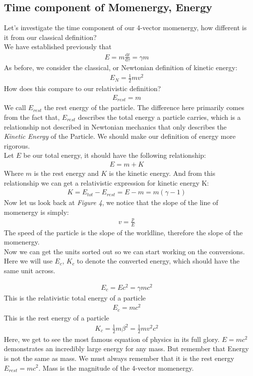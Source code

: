 \documentclass[12pt]{book}
\newcommand{\dydx}[2]{\frac{\text{d} #1}{\text{d} #2}}
\begin{document}
\subsection{Time component of Momenergy, Energy}
Let's investigate the time component of our 4-vector momenergy, how different is it from our classical definition?\\
\newline 
We have established previously that 
\begin{align}
E =m \dydx{t}{\tau} =\gamma m
\end{align}
As before, we consider the classical, or Newtonian definition of kinetic energy:
\begin{align}
E_{N} = \frac{1}{2}mv^2
\end{align}
How does this compare to our relativistic definition?
\begin{align}
E_{rest} = m
\end{align}
We call $E_{rest}$ the rest energy of the particle. The difference here primarily comes from the fact that, $E_{rest}$ describes the total energy a particle carries, which is a relationship not described in Newtonian mechanics that only describes the \textit{Kinetic Energy} of the Particle. We should make our definition of energy more rigorous. \\
\newline
Let $E$ be our total energy, it should have the following relationship:
\begin{align}
E = m + K
\end{align}
Where $m$ is the rest energy and $K$ is the kinetic energy. And from this relationship we can get a relativistic expression for kinetic energy K:
\begin{align}
K = E_{tot} - E_{rest} = E - m = m(\gamma - 1)
\end{align}
Now let us look back at \textit{Figure 4}, we notice that the slope of the line of momenergy is simply:
\begin{align}
v = \frac{p}{E}
\end{align}
The speed of the particle is the slope of the worldline, therefore the slope of the momenergy. \\
\newline
Now we can get the units sorted out so we can start working on the conversions. Here we will use $E_c$, $K_c$ to denote the converted energy, which should have the same unit across.

\begin{align}
E_c = Ec^2 = \gamma mc^2
\end{align}
This is the relativistic total energy of a particle 
\begin{align}
E_c = mc^2
\end{align}
This is the rest energy of a particle
\begin{align}
K_c = \frac{1}{2}m\beta^2= \frac{1}{2}mv^2c^2 
\end{align}
Here, we get to see the most famous equation of physics in its full glory. $E = mc^2$ demonstrates an incredibly large energy for any mass. But remember that Energy is not the same as mass. We must always remember that it is the rest energy $E_{rest} = mc^2$. Mass is the magnitude of the 4-vector momenergy. 
\end{document}
